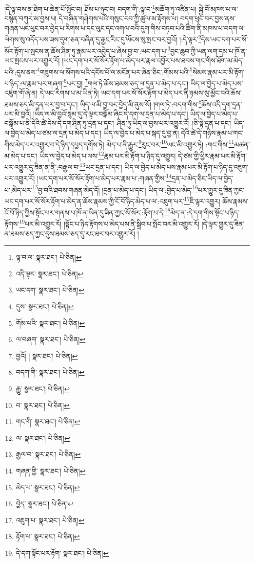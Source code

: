 །དེ་ལྟ་བས་ན་ཐེག་པ་ཆེན་པོ་སྤོང་བ། ཐོས་པ་ཉུང་བ། བདག་གི་:ལྟ་བ་\footnote{ལྟ་བ་ལ་  སྣར་ཐང་།  པེ་ཅིན། }མཆོག་ཏུ་འཛིན་པ། སྐྱེ་བོ་མཁས་པ་ལ་བསྙེན་བཀུར་མ་བྱས་པ། དེ་བཞིན་གཤེགས་པའི་གསུང་རབ་ཀྱི་ཚུལ་མ་རྟོགས་པ། བདག་ཕུང་བར་བྱས་ནས་གཞན་ཡང་ཕུང་བར་བྱེད་པ་རིགས་པ་དང་ལུང་དང་འགལ་བའི་དུག་གིས་བཏབ་པའི་ཚིག་ནི་མཁས་པ་བདག་ལ་ལེགས་སུ་འདོད་པས་ཟས་དུག་ཅན་བཞིན་དུ་རྒྱང་རིང་དུ་ཡོངས་སུ་སྤང་བར་བྱའོ། །:དེ་ལྟར་\footnote{འདི་ལྟར་  སྣར་ཐང་།  པེ་ཅིན། }དེས་ཡང་དག་པར་སོ་སོར་རྟོག་པ་སྤངས་ན་ཆོས་ཤིན་ཏུ་རྣམ་པར་འབྱེད་པ་ཞེས་བྱ་བ་:ཡང་དག་པ་\footnote{ཡང་དག་  སྣར་ཐང་།  པེ་ཅིན། }བྱང་ཆུབ་ཀྱི་ཡན་ལག་དམ་པ་ཁོ་ན་ཡང་སྤངས་པར་འགྱུར་རོ། །ཡང་དག་པར་སོ་སོར་རྟོག་པ་མེད་པར་རྣལ་འབྱོར་པས་ཐབས་གང་གིས་ཐོག་མ་མེད་པའི་:དུས་ནས་\footnote{དུས་  སྣར་ཐང་།  པེ་ཅིན། }གཟུགས་ལ་སོགས་པའི་དངོས་པོ་ལ་མངོན་པར་ཞེན་ཅིང་:གོམས་པའི་\footnote{གོམ་པའི་  སྣར་ཐང་།  པེ་ཅིན། }སེམས་རྣམ་པར་མི་རྟོག་པ་ཉིད་:ལ་རྣམ་པར་གཞག་\footnote{ལ་བཞག་  སྣར་ཐང་།  པེ་ཅིན། }པར་བྱ། \footnote{བྱའོ། །   སྣར་ཐང་།  པེ་ཅིན། }གལ་ཏེ་ཆོས་ཐམས་ཅད་ལ་དྲན་པ་མེད་པ་དང་། ཡིད་ལ་བྱེད་པ་མེད་པས་འཇུག་གོ་ཞེ་ན། དེ་ཡང་རིགས་པ་མ་ཡིན་ཏེ། ཡང་དག་པར་སོ་སོར་རྟོག་པ་མེད་པར་ནི་ཉམས་སུ་མྱོང་བའི་ཆོས་ཐམས་ཅད་མི་དྲན་པར་བྱ་བ་དང་། ཡིད་ལ་མི་བྱ་བར་བྱེད་མི་ནུས་སོ། །གལ་ཏེ་:བདག་གིས་\footnote{བདག་གི་  སྣར་ཐང་།  པེ་ཅིན། }ཆོས་འདི་དག་དྲན་པར་མི་བྱའོ། །ཡིད་ལ་མི་བྱའོ་སྙམ་དུ་དེ་ལྟར་བསྒོམ་ཞིང་དེ་དག་ལ་དྲན་པ་མེད་པ་དང་། ཡིད་ལ་བྱེད་པ་མེད་པ་བསྒོམ་པ་ནི་དེའི་ཚེ་དེས་དེ་དག་ཤིན་ཏུ་དྲན་པ་དང་། ཤིན་ཏུ་ཡིད་ལ་བྱས་པར་འགྱུར་རོ། །ཅི་སྟེ་དྲན་པ་དང་། ཡིད་ལ་བྱེད་པ་མེད་པ་ཙམ་ལ་དྲན་པ་མེད་པ་དང་། ཡིད་ལ་བྱེད་པ་མེད་པ་སྐད་དུ་བྱ་ན། དེའི་ཚེ་དེ་གཉིས་རྣམ་པ་གང་གིས་མེད་པར་འགྱུར་བ་དེ་ཉིད་དཔྱད་དགོས་ཏེ། མེད་པ་ནི་རྒྱུར་\footnote{རྒྱུ་  སྣར་ཐང་།  པེ་ཅིན། }རུང་བར་\footnote{བ་  སྣར་ཐང་།  པེ་ཅིན། }ཡང་མི་འགྱུར་ཏེ། :གང་གིས་\footnote{གང་གི་  སྣར་ཐང་།  པེ་ཅིན། }མཚན་མ་མེད་པ་དང་། ཡིད་ལ་བྱེད་པ་མེད་པ་ལས་\footnote{ལ་  སྣར་ཐང་།  པེ་ཅིན། }རྣམ་པར་མི་རྟོག་པ་ཉིད་དུ་འགྱུར། དེ་ཙམ་གྱི་ཕྱིར་རྣམ་པར་མི་རྟོག་པར་འགྱུར་དུ་ཟིན་ན་ནི་:བརྒྱལ་བ་\footnote{རྒྱལ་བ་  སྣར་ཐང་།  པེ་ཅིན། }ཡང་དྲན་པ་དང་། ཡིད་ལ་བྱེད་པ་མེད་པས་རྣམ་པར་མི་རྟོག་པ་ཉིད་དུ་འཇུག་པར་འགྱུར་རོ། །ཡང་དག་པར་སོ་སོར་རྟོག་པ་མེད་པར་རྣམ་པ་:གཞན་གྱིས་\footnote{གཞན་གྱི་  སྣར་ཐང་།  པེ་ཅིན། }དྲན་པ་མེད་ཅིང་ཡིད་ལ་བྱེད་པ་:མེད་པར་\footnote{མེད་པ་  སྣར་ཐང་།  པེ་ཅིན། }བྱ་བའི་ཐབས་གཞན་མེད་དོ། །དྲན་པ་མེད་པ་དང་། ཡིད་ལ་:བྱེད་པ་མེད་\footnote{བྱེད་  སྣར་ཐང་།  པེ་ཅིན། }པར་གྱུར་དུ་ཟིན་ཀྱང་ཡང་དག་པར་སོ་སོར་རྟོག་པ་མེད་ན་ཆོས་རྣམས་ཀྱི་ངོ་བོ་ཉིད་མེད་པ་ལ་:འཇུག་པར་\footnote{འཇུག་པ་  སྣར་ཐང་།  པེ་ཅིན། }ཇི་ལྟར་འགྱུར། ཆོས་རྣམས་ངོ་བོ་ཉིད་ཀྱིས་སྟོང་པར་གནས་པ་ཁོ་ན་ཡིན་དུ་ཟིན་ཀྱང་སོ་སོར་:རྟོག་པ་དེ་\footnote{རྟོག་པ་  སྣར་ཐང་།  པེ་ཅིན། }མེད་ན་:དེ་དག་གིས་སྟོང་པ་ཉིད་རྟོགས་\footnote{དེ་དག་སྟོང་པར་རྟོག་  སྣར་ཐང་།  པེ་ཅིན། }པར་མི་འགྱུར་རོ། །སྟོང་པ་ཉིད་རྟོགས་པ་མེད་པས་ནི་སྒྲིབ་པ་སྤོང་བར་མི་འགྱུར་རོ། །དེ་ལྟར་གྱུར་དུ་ཟིན་ན་ཐམས་ཅད་ཀྱང་དུས་ཐམས་ཅད་དུ་རང་ཐར་བར་འགྱུར་རོ། །
